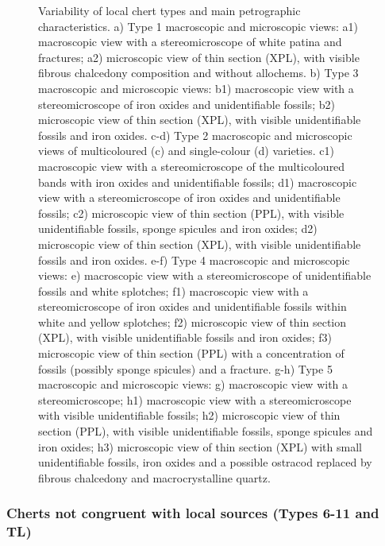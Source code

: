 \documentclass[
  a4paper,
  DIV=11,
  numbers=noendperiod]{scrreprt}
\begin{document}
\begin{figure}


\caption{\label{fig-local-types}Variability of local chert types and
main petrographic characteristics. a) Type 1 macroscopic and microscopic
views: a1) macroscopic view with a stereomicroscope of white patina and
fractures; a2) microscopic view of thin section (XPL), with visible
fibrous chalcedony composition and without allochems. b) Type 3
macroscopic and microscopic views: b1) macroscopic view with a
stereomicroscope of iron oxides and unidentifiable fossils; b2)
microscopic view of thin section (XPL), with visible unidentifiable
fossils and iron oxides. c-d) Type 2 macroscopic and microscopic views
of multicoloured (c) and single-colour (d) varieties. c1) macroscopic
view with a stereomicroscope of the multicoloured bands with iron oxides
and unidentifiable fossils; d1) macroscopic view with a stereomicroscope
of iron oxides and unidentifiable fossils; c2) microscopic view of thin
section (PPL), with visible unidentifiable fossils, sponge spicules and
iron oxides; d2) microscopic view of thin section (XPL), with visible
unidentifiable fossils and iron oxides. e-f) Type 4 macroscopic and
microscopic views: e) macroscopic view with a stereomicroscope of
unidentifiable fossils and white splotches; f1) macroscopic view with a
stereomicroscope of iron oxides and unidentifiable fossils within white
and yellow splotches; f2) microscopic view of thin section (XPL), with
visible unidentifiable fossils and iron oxides; f3) microscopic view of
thin section (PPL) with a concentration of fossils (possibly sponge
spicules) and a fracture. g-h) Type 5 macroscopic and microscopic views:
g) macroscopic view with a stereomicroscope; h1) macroscopic view with a
stereomicroscope with visible unidentifiable fossils; h2) microscopic
view of thin section (PPL), with visible unidentifiable fossils, sponge
spicules and iron oxides; h3) microscopic view of thin section (XPL)
with small unidentifiable fossils, iron oxides and a possible ostracod
replaced by fibrous chalcedony and macrocrystalline quartz.}

\end{figure}%

\subsubsection{Cherts not congruent with local sources (Types 6-11 and
TL)}\label{cherts-not-congruent-with-local-sources-types-6-11-and-tl}
\end{document}
